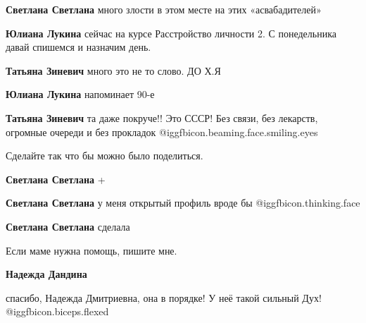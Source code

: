 \begin{itemize}
\begin{itemize}
\textbf{Светлана Светлана} много злости в этом месте на этих «асвабадителей»

\textbf{Юлиана Лукина} сейчас на курсе Расстройство личности 2. С понедельника давай спишемся и назначим день.

\textbf{Татьяна Зиневич} много это не то слово. ДО Х.Я

\textbf{Юлиана Лукина} напоминает 90-е

\textbf{Татьяна Зиневич} та даже покруче!! Это СССР! Без связи, без лекарств, огромные очереди и без прокладок  @igg{fbicon.beaming.face.smiling.eyes} 
\end{itemize} %

Сделайте так что бы можно было поделиться.

\begin{itemize} %
\textbf{Светлана Светлана} +

\textbf{Светлана Светлана} у меня открытый профиль вроде бы @igg{fbicon.thinking.face} 

\textbf{Светлана Светлана} сделала
\end{itemize} %

Если маме нужна помощь, пишите мне.

\textbf{Надежда Дандина} 

спасибо, Надежда Дмитриевна, она в порядке! У неё такой сильный Дух!
@igg{fbicon.biceps.flexed} 

\end{itemize} %
